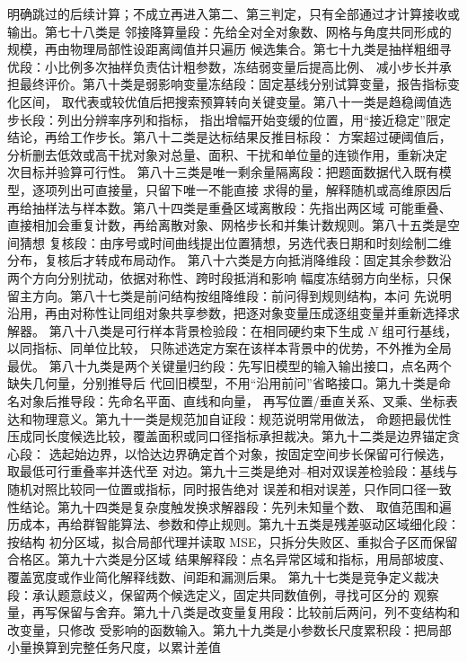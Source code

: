 明确跳过的后续计算；不成立再进入第二、第三判定，只有全部通过才计算接收或输出。第七十八类是
邻接降算量段：先给全对全对象数、网格与角度共同形成的规模，再由物理局部性设距离阈值并只遍历
候选集合。第七十九类是抽样粗细寻优段：小比例多次抽样负责估计粗参数，冻结弱变量后提高比例、
减小步长并承担最终评价。第八十类是弱影响变量冻结段：固定基线分别试算变量，报告指标变化区间，
取代表或较优值后把搜索预算转向关键变量。第八十一类是趋稳阈值选步长段：列出分辨率序列和指标，
指出增幅开始变缓的位置，用“接近稳定”限定结论，再给工作步长。第八十二类是达标结果反推目标段：
方案超过硬阈值后，分析删去低效或高干扰对象对总量、面积、干扰和单位量的连锁作用，重新决定
次目标并验算可行性。
第八十三类是唯一剩余量隔离段：把题面数据代入既有模型，逐项列出可直接量，只留下唯一不能直接
求得的量，解释随机或高维原因后再给抽样法与样本数。第八十四类是重叠区域离散段：先指出两区域
可能重叠、直接相加会重复计数，再给离散对象、网格步长和并集计数规则。第八十五类是空间猜想
复核段：由序号或时间曲线提出位置猜想，另选代表日期和时刻绘制二维分布，复核后才转成布局动作。
第八十六类是方向抵消降维段：固定其余参数沿两个方向分别扰动，依据对称性、跨时段抵消和影响
幅度冻结弱方向坐标，只保留主方向。第八十七类是前问结构按组降维段：前问得到规则结构，本问
先说明沿用，再由对称性让同组对象共享参数，把逐对象变量压成逐组变量并重新选择求解器。
第八十八类是可行样本背景检验段：在相同硬约束下生成 $N$ 组可行基线，以同指标、同单位比较，
只陈述选定方案在该样本背景中的优势，不外推为全局最优。
第八十九类是两个关键量归约段：先写旧模型的输入输出接口，点名两个缺失几何量，分别推导后
代回旧模型，不用“沿用前问”省略接口。第九十类是命名对象后推导段：先命名平面、直线和向量，
再写位置/垂直关系、叉乘、坐标表达和物理意义。第九十一类是规范加自证段：规范说明常用做法，
命题把最优性压成同长度候选比较，覆盖面积或同口径指标承担裁决。第九十二类是边界锚定贪心段：
选起始边界，以恰达边界确定首个对象，按固定空间步长保留可行候选，取最低可行重叠率并迭代至
对边。第九十三类是绝对--相对双误差检验段：基线与随机对照比较同一位置或指标，同时报告绝对
误差和相对误差，只作同口径一致性结论。第九十四类是复杂度触发换求解器段：先列未知量个数、
取值范围和遍历成本，再给群智能算法、参数和停止规则。第九十五类是残差驱动区域细化段：按结构
初分区域，拟合局部代理并读取 MSE，只拆分失败区、重拟合子区而保留合格区。第九十六类是分区域
结果解释段：点名异常区域和指标，用局部坡度、覆盖宽度或作业简化解释线数、间距和漏测后果。
第九十七类是竞争定义裁决段：承认题意歧义，保留两个候选定义，固定共同数值例，寻找可区分的
观察量，再写保留与舍弃。第九十八类是改变量复用段：比较前后两问，列不变结构和改变量，只修改
受影响的函数输入。第九十九类是小参数长尺度累积段：把局部小量换算到完整任务尺度，以累计差值
